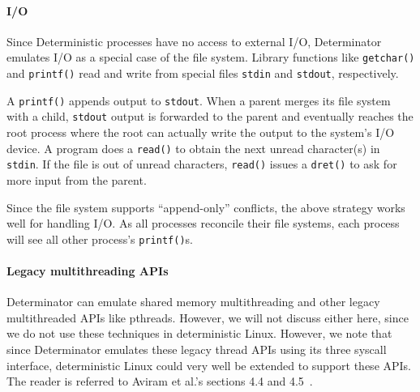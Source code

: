 \paragraph{I/O}
Since Deterministic processes have no access to external I/O, Determinator
emulates I/O as a special case of the file system. Library functions like
{\tt getchar()} and {\tt printf()} read and write from special files
{\tt stdin} and {\tt stdout}, respectively.

A {\tt printf()} appends output to {\tt stdout}. When a parent merges its
file system with a child, {\tt stdout} output is forwarded
to the parent and eventually reaches the root process where the root can
actually write the output to the system's I/O device.
A program does a {\tt read()} to obtain the next unread character(s) in
{\tt stdin}. If the file is out of unread characters, {\tt read()} issues a
{\tt dret()} to ask for more input from the parent.

Since the file system supports ``append-only'' conflicts, the above strategy
works well for handling I/O. As all processes reconcile their file
systems, each process will see all other process's {\tt printf()}s.

\paragraph{Legacy multithreading APIs}
Determinator can emulate shared memory multithreading and other legacy
multithreaded APIs like pthreads. However, we will not discuss either here,
since we do not use these techniques in deterministic Linux. However, we note
that since Determinator emulates these legacy thread APIs using its three
syscall interface, deterministic Linux could very well be extended to support
these APIs. The reader is referred to Aviram et al.'s sections 4.4 and
4.5~\cite{Aviram10}.

\endinput

